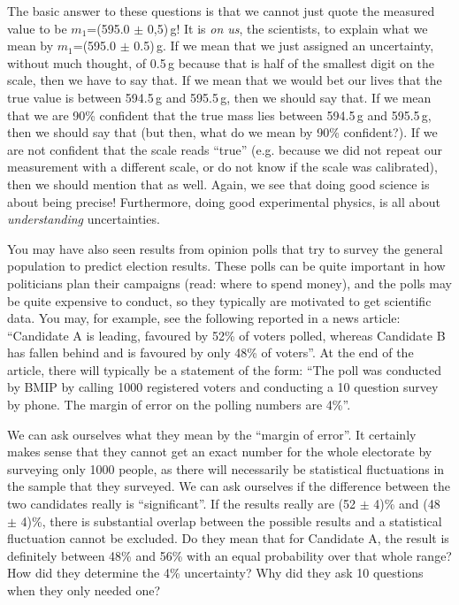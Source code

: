 The basic answer to these questions is that we cannot just quote the measured value to be $m_1$=(595.0 $\pm$ 0,5)\,g! It is \textit{on us}, the scientists, to explain what we mean by $m_1$=(595.0 $\pm$ 0.5)\,g. If we mean that we just assigned an uncertainty, without much thought, of 0.5\,g because that is half of the smallest digit on the scale, then we have to say that. If we mean that we would bet our lives that the true value is between 594.5\,g and 595.5\,g, then we should say that. If we mean that we are 90\% confident that the true mass lies between 594.5\,g and 595.5\,g, then we should say that (but then, what do we mean by 90\% confident?). If we are not confident that the scale reads ``true'' (e.g. because we did not repeat our measurement with a different scale, or do not know if the scale was calibrated), then we should mention that as well. Again, we see that doing good science is about being precise! Furthermore, doing good experimental physics, is all about \textit{understanding} uncertainties.

You may have also seen results from opinion polls that try to survey the general population to predict election results. These polls can be quite important in how politicians plan their campaigns (read: where to spend money), and the polls may be quite expensive to conduct, so they typically are motivated to get scientific data. You may, for example, see the following reported in a news article: ``Candidate A is leading, favoured by 52\% of voters polled, whereas Candidate B has fallen behind and is favoured by only 48\% of voters''. At the end of the article, there will typically be a statement of the form: ``The poll was conducted by BMIP by calling 1000 registered voters and conducting a 10 question survey by phone. The margin of error on the polling numbers are 4\%''.

We can ask ourselves what they mean by the ``margin of error''. It certainly makes sense that they cannot get an exact number for the whole electorate by surveying only 1000 people, as there will necessarily be statistical fluctuations in the sample that they surveyed. We can ask ourselves if the difference between the two candidates really is ``significant''. If the results really are (52 $\pm$ 4)\% and (48 $\pm$ 4)\%, there is substantial overlap between the possible results and a statistical fluctuation cannot be excluded. Do they mean that for Candidate A, the result is definitely between 48\% and 56\% with an equal probability over that whole range? How did they determine the 4\% uncertainty? Why did they ask 10 questions when they only needed one?

